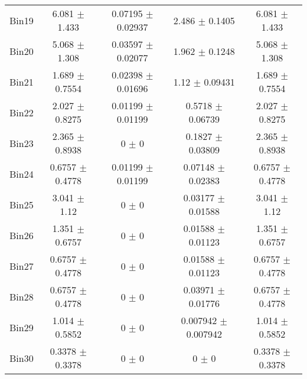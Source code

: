 \begin{tabular}{@{\extracolsep{4pt}}lcccc@{}}
     Bin19 & 6.081 $\pm$ 1.433 & 0.07195 $\pm$ 0.02937 & 2.486 $\pm$ 0.1405 & 6.081 $\pm$ 1.433 \\ 
     Bin20 & 5.068 $\pm$ 1.308 & 0.03597 $\pm$ 0.02077 & 1.962 $\pm$ 0.1248 & 5.068 $\pm$ 1.308 \\ 
     Bin21 & 1.689 $\pm$ 0.7554 & 0.02398 $\pm$ 0.01696 & 1.12 $\pm$ 0.09431 & 1.689 $\pm$ 0.7554 \\ 
     Bin22 & 2.027 $\pm$ 0.8275 & 0.01199 $\pm$ 0.01199 & 0.5718 $\pm$ 0.06739 & 2.027 $\pm$ 0.8275 \\ 
     Bin23 & 2.365 $\pm$ 0.8938 & 0 $\pm$ 0 & 0.1827 $\pm$ 0.03809 & 2.365 $\pm$ 0.8938 \\ 
     Bin24 & 0.6757 $\pm$ 0.4778 & 0.01199 $\pm$ 0.01199 & 0.07148 $\pm$ 0.02383 & 0.6757 $\pm$ 0.4778 \\ 
     Bin25 & 3.041 $\pm$ 1.12 & 0 $\pm$ 0 & 0.03177 $\pm$ 0.01588 & 3.041 $\pm$ 1.12 \\ 
     Bin26 & 1.351 $\pm$ 0.6757 & 0 $\pm$ 0 & 0.01588 $\pm$ 0.01123 & 1.351 $\pm$ 0.6757 \\ 
     Bin27 & 0.6757 $\pm$ 0.4778 & 0 $\pm$ 0 & 0.01588 $\pm$ 0.01123 & 0.6757 $\pm$ 0.4778 \\ 
     Bin28 & 0.6757 $\pm$ 0.4778 & 0 $\pm$ 0 & 0.03971 $\pm$ 0.01776 & 0.6757 $\pm$ 0.4778 \\ 
     Bin29 & 1.014 $\pm$ 0.5852 & 0 $\pm$ 0 & 0.007942 $\pm$ 0.007942 & 1.014 $\pm$ 0.5852 \\ 
     Bin30 & 0.3378 $\pm$ 0.3378 & 0 $\pm$ 0 & 0 $\pm$ 0 & 0.3378 $\pm$ 0.3378 \\ 
\hline\hline
  \end{tabular}

